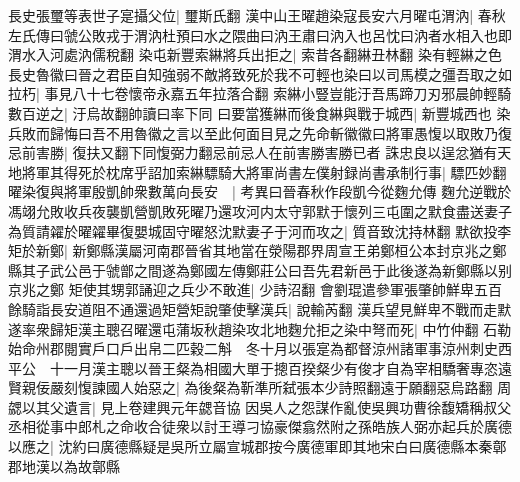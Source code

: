 長史張璽等表世子寔攝父位|{
	璽斯氏翻}
漢中山王曜趙染寇長安六月曜屯渭汭|{
	春秋左氏傳曰虢公敗戎于渭汭杜預曰水之隈曲曰汭王肅曰汭入也呂忱曰汭者水相入也即渭水入河處汭儒稅翻}
染屯新豐索綝將兵出拒之|{
	索昔各翻綝丑林翻}
染有輕綝之色長史魯徽曰晉之君臣自知強弱不敵將致死於我不可輕也染曰以司馬模之彊吾取之如拉朽|{
	事見八十七卷懷帝永嘉五年拉落合翻}
索綝小豎豈能汙吾馬蹄刀刃邪晨帥輕騎數百逆之|{
	汙烏故翻帥讀曰率下同}
曰要當獲綝而後食綝與戰于城西|{
	新豐城西也}
染兵敗而歸悔曰吾不用魯徽之言以至此何面目見之先命斬徽徽曰將軍愚愎以取敗乃復忌前害勝|{
	復扶又翻下同愎弼力翻忌前忌人在前害勝害勝已者}
誅忠良以逞忿猶有天地將軍其得死於枕席乎詔加索綝驃騎大將軍尚書左僕射録尚書承制行事|{
	驃匹妙翻}
曜染復與將軍殷凱帥衆數萬向長安　|{
	考異曰晉春秋作段凱今從麴允傳}
麴允逆戰於馮翊允敗收兵夜襲凱營凱敗死曜乃還攻河内太守郭默于懷列三屯圍之默食盡送妻子為質請糴於曜糴畢復嬰城固守曜怒沈默妻子于河而攻之|{
	質音致沈持林翻}
默欲投李矩於新鄭|{
	新鄭縣漢屬河南郡晉省其地當在滎陽郡界周宣王弟鄭桓公本封京兆之鄭縣其子武公邑于虢鄫之間遂為鄭國左傳鄭莊公曰吾先君新邑于此後遂為新鄭縣以别京兆之鄭}
矩使其甥郭誦迎之兵少不敢進|{
	少詩沼翻}
會劉琨遣參軍張肇帥鮮卑五百餘騎詣長安道阻不通還過矩營矩說肇使擊漢兵|{
	說輸芮翻}
漢兵望見鮮卑不戰而走默遂率衆歸矩漢主聰召曜還屯蒲坂秋趙染攻北地麴允拒之染中弩而死|{
	中竹仲翻}
石勒始命州郡閱實戶口戶出帛二匹穀二斛　冬十月以張寔為都督涼州諸軍事涼州刺史西平公　十一月漢主聰以晉王粲為相國大單于摠百揆粲少有俊才自為宰相驕奢專恣遠賢親佞嚴刻愎諫國人始惡之|{
	為後粲為靳準所弑張本少詩照翻遠于願翻惡烏路翻}
周勰以其父遺言|{
	見上卷建興元年勰音協}
因吳人之怨謀作亂使吳興功曹徐馥矯稱叔父丞相從事中郎札之命收合徒衆以討王導刁協豪傑翕然附之孫皓族人弼亦起兵於廣德以應之|{
	沈約曰廣德縣疑是吳所立屬宣城郡按今廣德軍即其地宋白曰廣德縣本秦鄣郡地漢以為故鄣縣}


